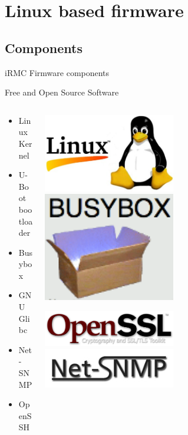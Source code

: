 \documentclass{beamer}
\begin{document}
\section{Linux based firmware}
  \subsection{Components}
  \begin{frame}{iRMC Firmware components}

	  \begin{block}{Free and Open Source Software}
		\begin{columns}[onlytextwidth]
			\begin{column}{0.6\textwidth}
			      	\begin{itemize}
					\item Linux Kernel
					\item U-Boot bootloader
					\item Busybox
					\item GNU Glibc
					\item Net-SNMP
					\item OpenSSH
				\end{itemize}
			\end{column}

			\begin{column}{0.3\textwidth}

				\includegraphics[width=0.5\textwidth]{logo/linux.jpg} 			
				\includegraphics[width=0.5\textwidth]{logo/busybox.png}
				
				\includegraphics[width=0.5\textwidth]{logo/openssl.png} 
				\includegraphics[width=0.5\textwidth]{logo/netsnmp.jpg}


\end{column}
\end{columns}
\end{block}
\end{frame}
\end{document}

